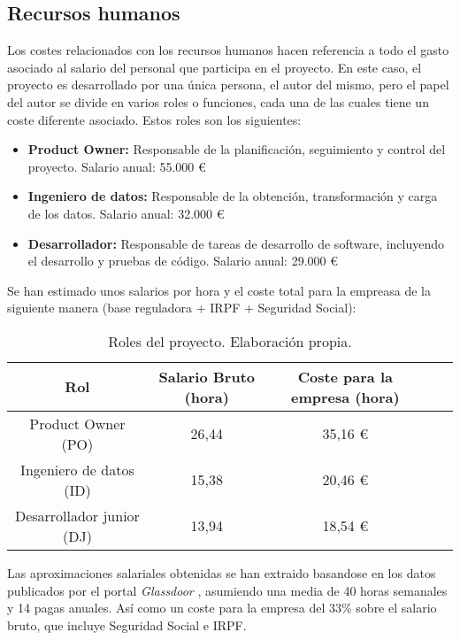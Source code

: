 \subsection{Recursos humanos}

Los costes relacionados con los recursos humanos hacen referencia a todo el gasto asociado al salario del personal que participa en el proyecto. 
En este caso, el proyecto es desarrollado por una única persona, el autor del mismo, pero el papel del autor se divide en varios roles o funciones, 
cada una de las cuales tiene un coste diferente asociado. Estos roles son los siguientes:
\begin{itemize}
    \item  \textbf{Product Owner:} Responsable de la planificación, seguimiento y control del proyecto. Salario anual: 55.000 €
    \item  \textbf{Ingeniero de datos:} Responsable de la obtención, transformación y carga de los datos. Salario anual: 32.000 €
    \item  \textbf{Desarrollador:} Responsable de tareas de desarrollo de software, incluyendo el desarrollo y pruebas de código. Salario anual: 29.000 €
\end{itemize}

Se han estimado unos salarios por hora y el coste total para la empreasa de la siguiente manera (base reguladora + IRPF + Seguridad Social):

\begin{table}[H]
    \centering
    \begin{tabular}{|c|c|c|c|c|}
        \hline
        \textbf{Rol} & \textbf{Salario Bruto (hora)} & \textbf{Coste para la empresa (hora)}\\
        \hline
        Product Owner (PO) & 26,44 & 35,16 € \\
        Ingeniero de datos (ID) & 15,38 & 20,46 € \\
        Desarrollador junior (DJ) & 13,94 & 18,54  € \\
        \hline
    \end{tabular}
    \caption{Roles del proyecto. Elaboración propia.}
    \label{tab:estimaciones}
\end{table}

Las aproximaciones salariales obtenidas se han extraido basandose en los datos publicados por el portal \textit{Glassdoor} \cite{glassdoor}, 
asumiendo una media de 40 horas semanales y 14 pagas anuales. Así como un coste para la empresa del 33\% sobre el salario bruto, que incluye Seguridad Social e IRPF.

